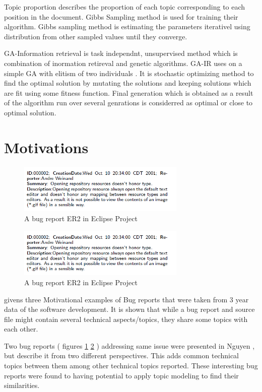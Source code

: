 \documentclass[]{sig-alternate-05-2015}
\begin{document}
Topic proportion describes the proportion of each topic corresponding to each position in the document. Gibbs Sampling method is used for training their algorithm. Gibbs sampling method is estimating the parameters iterativel using distribution from other sampled values until they converge.\newline

GA-Information retrieval is task independnt, unsupervised method which  is combination of inormation retireval and genetic algorithms. GA-IR uses on a simple GA with elitism of two individuals \cite{Klabbankoh2010}. It is stochastic optimizing method to find the optimal solution by mutating the solutions and keeping solutions which are fit using some fitness function. Final generation which is obtained as a result of the algorithm run over several genrations is considerred as optimal or close to optimal solution.

\section{Motivations}
\begin{figure}
\centering
\includegraphics[width=8cm]{onefig1.png}
\caption{A bug report ER2 in Eclipse Project}
\label{fig:onefig1}
\end{figure}
\begin{figure}
\centering
\includegraphics[width=8cm]{onefig1.png}
\caption{A bug report ER2 in Eclipse Project}
\label{fig:onefig2}
\end{figure}

\cite{Nguyen} givens three Motivational examples of Bug reports that were taken from 3 year data of the software development.  It is shown that while a bug report and source file might contain several technical aspects/topics, they share some topics with each other. \newline

Two bug reports ( figures \ref{fig:onefig1} \ref{fig:onefig2} )  addressing same issue were presented in Nguyen \cite{Nguyen2012}, but describe it from two different perspectives. This adds common technical topics between them among other technical topics reported. These interesting bug reports were found to having potential to apply topic modeling to find their similarities. \newline
\end{document}
